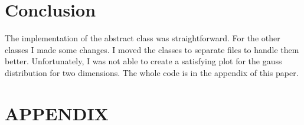\documentclass[10pt, a4paper, twocolumn]{article} %
\begin{document}
\section{Conclusion}
The implementation of the abstract class was straightforward. For the other classes I made some changes. I moved the classes to separate files to handle them better. Unfortunately, I was not able to create a satisfying plot for the gauss distribution for two dimensions. The whole code is in the appendix of this paper. 


\printbibliography[title={Bibliography}] %


\section*{APPENDIX}
\end{document}

